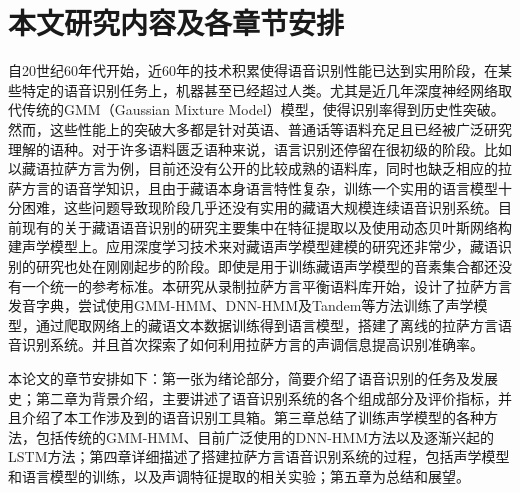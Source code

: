 \section{本文研究内容及各章节安排}
自20世纪60年代开始，近60年的技术积累使得语音识别性能已达到实用阶段，在某些特定的语音识别任务上，机器甚至已经超过人类。尤其是近几年深度神经网络取代传统的GMM（Gaussian Mixture Model）模型，使得识别率得到历史性突破。然而，这些性能上的突破大多都是针对英语、普通话等语料充足且已经被广泛研究理解的语种。对于许多语料匮乏语种来说，语言识别还停留在很初级的阶段。比如以藏语拉萨方言为例，目前还没有公开的比较成熟的语料库，同时也缺乏相应的拉萨方言的语音学知识，且由于藏语本身语言特性复杂，训练一个实用的语言模型十分困难，这些问题导致现阶段几乎还没有实用的藏语大规模连续语音识别系统。目前现有的关于藏语语音识别的研究主要集中在特征提取以及使用动态贝叶斯网络构建声学模型上。应用深度学习技术来对藏语声学模型建模的研究还非常少，藏语识别的研究也处在刚刚起步的阶段。即使是用于训练藏语声学模型的音素集合都还没有一个统一的参考标准。本研究从录制拉萨方言平衡语料库开始，设计了拉萨方言发音字典，尝试使用GMM-HMM、DNN-HMM及Tandem等方法训练了声学模型，通过爬取网络上的藏语文本数据训练得到语言模型，搭建了离线的拉萨方言语音识别系统。并且首次探索了如何利用拉萨方言的声调信息提高识别准确率。

本论文的章节安排如下：第一张为绪论部分，简要介绍了语音识别的任务及发展史；第二章为背景介绍，主要讲述了语音识别系统的各个组成部分及评价指标，并且介绍了本工作涉及到的语音识别工具箱。第三章总结了训练声学模型的各种方法，包括传统的GMM-HMM、目前广泛使用的DNN-HMM方法以及逐渐兴起的LSTM方法；第四章详细描述了搭建拉萨方言语音识别系统的过程，包括声学模型和语言模型的训练，以及声调特征提取的相关实验；第五章为总结和展望。
